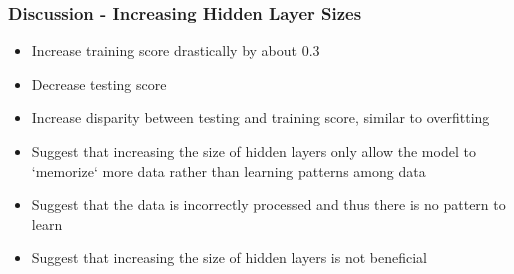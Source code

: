 \documentclass{beamer}
\begin{document}
\begin{frame}
  \frametitle{Discussion - Increasing Hidden Layer Sizes}
  \begin{itemize}
    \item Increase training score drastically by about 0.3
    \item Decrease testing score
    \item Increase disparity between testing and training score, similar to overfitting
    \item Suggest that increasing the size of hidden layers only allow the model to `memorize` more data rather than learning patterns among data
    \item Suggest that the data is incorrectly processed and thus there is no pattern to learn
    \item Suggest that increasing the size of hidden layers is not beneficial
  \end{itemize}
\end{frame}
\end{document}
